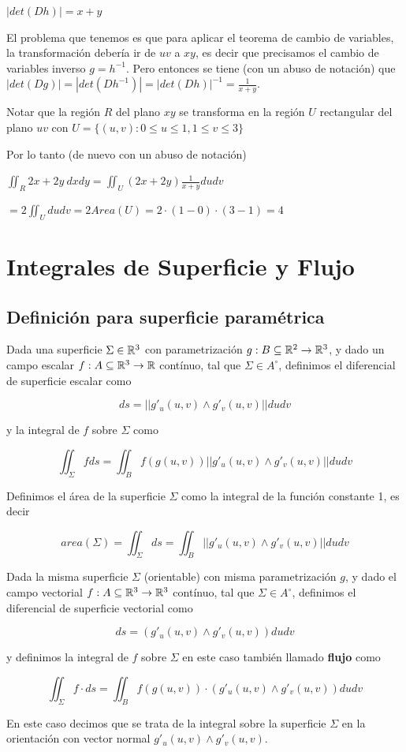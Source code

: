 $|det(Dh)| = x+y$

El problema que tenemos es que para aplicar el teorema de cambio de variables, la transformación debería ir de $uv$ a $xy$, es decir que precisamos el cambio de variables inverso $g = h^{-1}$.  Pero entonces se tiene (con un abuso de notación) que $|det(Dg)| = |det(Dh^{-1})| = |det(Dh)|^{-1} = \frac{1}{x+y}$.

Notar que la región $R$ del plano $xy$ se transforma en la región $U$ rectangular del plano $uv$ con $U = \{(u,v) : 0 \leq u \leq 1, 1 \leq v \leq 3 \}$

Por lo tanto (de nuevo con un abuso de notación)

$\iint_{R} 2x+2y \ dxdy = \iint_U (2x+2y) \frac{1}{x+y} dudv$

$= 2 \iint_U dudv = 2 Area(U) = 2 \cdot (1-0) \cdot (3-1) = 4$



\chapter{Integrales de Superficie y Flujo}

\section{Definición para superficie paramétrica}

\begin{definition} 
Dada una superficie $\Sigma \in \mathbb{R}^3$ con parametrización $ g: B \subseteq \mathbb{R}^2 \to \mathbb{R}^3$, y dado un campo escalar $f : A \subseteq \mathbb{R}^3 \to \mathbb{R}$ contínuo, tal que $\Sigma \in A^{\circ}$, definimos el diferencial de superficie escalar como

$$ ds = || g'_u(u,v) \wedge g'_v(u,v) || dudv $$

y la integral de $f$ sobre $\Sigma$ como

$$ \iint_\Sigma f ds = \iint_B f(g(u,v)) || g'_u(u,v) \wedge g'_v(u,v) || dudv $$

Definimos el área de la superficie $\Sigma$ como la integral de la función constante 1, es decir

$$ area(\Sigma) = \iint_{\Sigma} ds = \iint_B || g'_u(u,v) \wedge g'_v(u,v) || dudv $$

Dada la misma superficie $\Sigma$ (orientable) con misma parametrización $g$, y dado el campo vectorial $f : A \subseteq \mathbb{R}^3 \to \mathbb{R}^3$ contínuo, tal que $\Sigma \in A^{\circ}$, definimos el diferencial de superficie vectorial como

$$ ds = ( g'_u(u,v) \wedge g'_v(u,v) ) dudv $$

y definimos la integral de $f$ sobre $\Sigma$ en este caso también llamado \textbf{flujo} como 

$$ \iint_\Sigma f \cdot ds = \iint_B f(g(u,v)) \cdot (g'_u(u,v) \wedge g'_v(u,v)) dudv $$

En este caso decimos que se trata de la integral sobre la superficie $\Sigma$ en la orientación con vector normal $g'_u(u,v) \wedge g'_v(u,v)$.
\end{definition}

